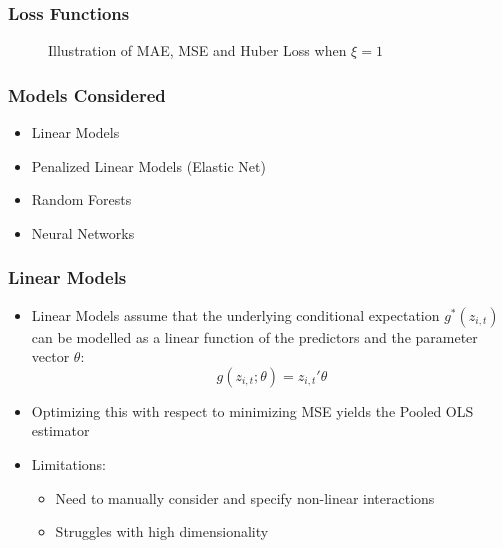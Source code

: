 \documentclass{beamer}
\begin{document}
\begin{frame}
\frametitle{Loss Functions}
\begin{figure}
	\begin{center}
	\end{center}
	\caption{Illustration of MAE, MSE and Huber Loss when $\xi = 1$}
	\label{fig:loss_functions}
\end{figure}
\end{frame}

\begin{frame}
\frametitle{Models Considered}
\begin{itemize}
	\item Linear Models
	\item Penalized Linear Models (Elastic Net)
	\item Random Forests
	\item Neural Networks
\end{itemize}
\end{frame}

\begin{frame}
\frametitle{Linear Models}
\begin{itemize}
	\item Linear Models assume that the underlying conditional expectation \( g^*(z_{i, t}) \) can be modelled as a linear function of the predictors and the parameter vector \( \theta \):
	\begin{equation}
	g(z_{i, t};\theta) = z_{i, t}' \theta
	\end{equation}
	\item Optimizing this with respect to minimizing MSE yields the Pooled OLS estimator
	\item Limitations:
	\begin{itemize}
		\item Need to manually consider and specify non-linear interactions
		\item Struggles with high dimensionality
	\end{itemize}
\end{itemize}
\end{frame}
\end{document}
